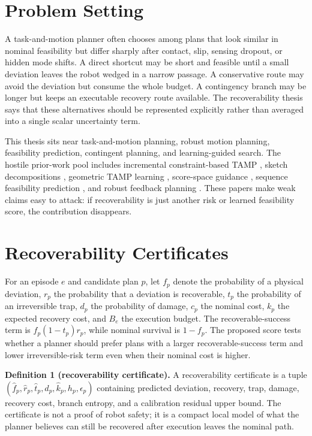 \documentclass{article}
\begin{document}
\section{Problem Setting}

A task-and-motion planner often chooses among plans that look similar in nominal feasibility but differ sharply after contact, slip, sensing dropout, or hidden mode shifts. A direct shortcut may be short and feasible until a small deviation leaves the robot wedged in a narrow passage. A conservative route may avoid the deviation but consume the whole budget. A contingency branch may be longer but keeps an executable recovery route available. The recoverability thesis says that these alternatives should be represented explicitly rather than averaged into a single scalar uncertainty term.

This thesis sits near task-and-motion planning, robust motion planning, feasibility prediction, contingent planning, and learning-guided search. The hostile prior-work pool includes incremental constraint-based TAMP \citep{pool82_01}, sketch decompositions \citep{pool82_03}, geometric TAMP learning \citep{pool82_04}, score-space guidance \citep{pool82_08}, sequence feasibility prediction \citep{pool82_12}, and robust feedback planning \citep{pool82_18}. These papers make weak claims easy to attack: if recoverability is just another risk or learned feasibility score, the contribution disappears.

\section{Recoverability Certificates}

For an episode $e$ and candidate plan $p$, let $f_p$ denote the probability of a physical deviation, $r_p$ the probability that a deviation is recoverable, $t_p$ the probability of an irreversible trap, $d_p$ the probability of damage, $c_p$ the nominal cost, $k_p$ the expected recovery cost, and $B_e$ the execution budget. The recoverable-success term is $f_p(1-t_p)r_p$, while nominal survival is $1-f_p$. The proposed score tests whether a planner should prefer plans with a larger recoverable-success term and lower irreversible-risk term even when their nominal cost is higher.

\textbf{Definition 1 (recoverability certificate).} A recoverability certificate is a tuple $(\hat f_p,\hat r_p,\hat t_p,\hat d_p,\hat k_p,h_p,\epsilon_p)$ containing predicted deviation, recovery, trap, damage, recovery cost, branch entropy, and a calibration residual upper bound. The certificate is not a proof of robot safety; it is a compact local model of what the planner believes can still be recovered after execution leaves the nominal path.
\end{document}
